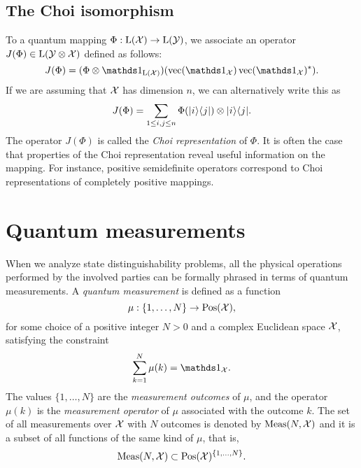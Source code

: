 \subsection{The Choi isomorphism}
\label{sec:choi-isomorphism}

To a quantum mapping $\Phi : \mathrm{L}(\mathcal{X})\rightarrow\mathrm{L}(\mathcal{Y})$, we associate an 
operator $J(\Phi) \in \mathrm{L}(\mathcal{Y}\otimes\mathcal{X})$ defined as follows:
\begin{equation}
  J(\Phi) = (\Phi\otimes\I_{\Lin(\X)})(\vec(\I_{\X})\vec(\I_{\X})^{\ast}).
\end{equation}
If we are assuming that $\mathcal{X}$ has dimension $n$, we can alternatively write this as
\begin{equation}
  J(\Phi) = \sum_{1\leq i,j \leq n}\Phi(\lvert\mspace{0.5mu} i \mspace{0.5mu} \rangle\langle\mspace{0.5mu} j \mspace{0.5mu} \rvert)\otimes\lvert\mspace{0.5mu} i \mspace{0.5mu} \rangle\langle\mspace{0.5mu} j \mspace{0.5mu} \rvert.
\end{equation}
The operator $J(\Phi)$ is called the \emph{Choi representation}
of $\Phi$.
It is often the case that properties of the Choi representation reveal useful information 
on the mapping. For instance, positive semidefinite operators correspond to Choi representations 
of completely positive mappings.

\section{Quantum measurements}
\label{sec:quantum-measurements}
When we analyze state distinguishability problems, all the physical operations
performed by the involved parties can be formally phrased in terms of quantum 
measurements. 
A \emph{quantum measurement} is defined as a function 
\begin{equation}
\label{eq:def-measurement}
  \mu : \{ 1, \ldots, N \} \rightarrow \mathrm{Pos}(\mathcal{X}),
\end{equation}
for some choice of a positive integer $N > 0$ and a complex Euclidean space $\mathcal{X}$, 
satisfying the constraint
\begin{equation}
\label{eq:measurement-sum}
  \sum_{k=1}^{N} \mu(k) = \I_{\X}.
\end{equation}
The values $\{1, \ldots, N\}$ are the \emph{measurement outcomes} of $\mu$,
and the operator $\mu(k)$ is the \emph{measurement operator} of $\mu$ 
associated with the outcome $k$.
The set of all measurements over $\mathcal{X}$ with $N$ outcomes is denoted by 
$\mathrm{Meas}(N, \mathcal{X})$ and it is a subset of all functions of the same kind of $\mu$, that is,
\begin{equation}
  \mathrm{Meas}(N, \mathcal{X}) \subset \mathrm{Pos}(\mathcal{X})^{\{1,\ldots,N\}}.
\end{equation}

